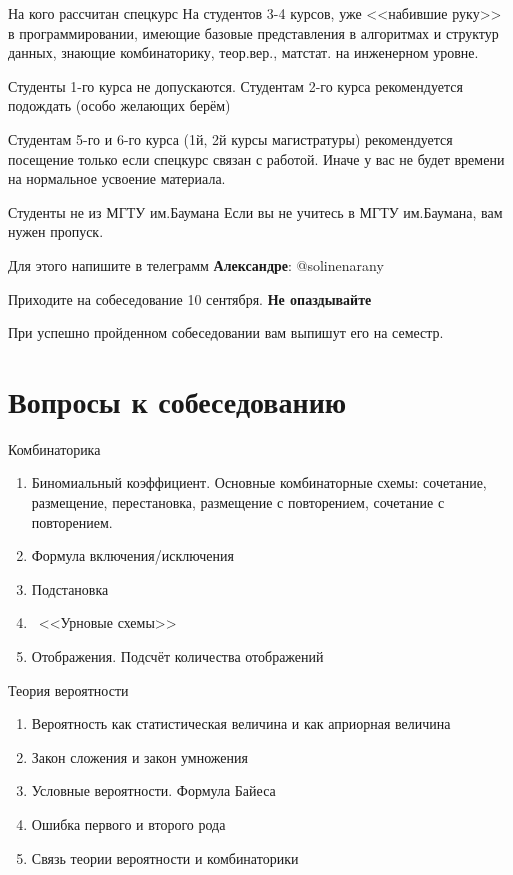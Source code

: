 \documentclass{beamer}
\newcommand{\рис}[1]{рис.\ref{#1}}
\newcommand{\Рис}[1]{Рис.\ref{#1}}
\newcommand{\таблицa}[1]{таблица~№\ref{#1}} %
\newcommand{\таблицы}[1]{таблицы~№\ref{#1}} %
\newcommand{\таблице}[1]{таблице~№\ref{#1}} %
\newcommand{\таблицу}[1]{таблицу~№\ref{#1}} %
\newcommand{\таблицей}[1]{таблицей~№\ref{#1}} %
\newcommand{\Таблицa}[1]{Таблица~№\ref{#1}} %
\newcommand{\Таблицы}[1]{Таблицы~№\ref{#1}} %
\newcommand{\Таблице}[1]{Таблице~№\ref{#1}} %
\newcommand{\Таблицу}[1]{Таблицу~№\ref{#1}} %
\newcommand{\Таблицей}[1]{Таблицей~№\ref{#1}} %
\begin{document}
  \begin{frame}{На кого рассчитан спецкурс}
  На студентов 3-4 курсов, уже <<набившие руку>> в программировании,
  имеющие базовые представления в алгоритмах и структур данных,
  знающие комбинаторику, теор.вер., матстат. на инженерном уровне.
  
  Студенты 1-го курса не допускаются. Студентам 2-го курса рекомендуется подождать
  (особо желающих берём)
  
  Студентам 5-го и 6-го курса (1й, 2й курсы магистратуры) рекомендуется посещение только если 
  спецкурс
  связан с работой.
  Иначе у вас не будет времени на нормальное усвоение материала.
  
  \end{frame}

  \begin{frame}{Студенты не из МГТУ им.Баумана}
  Если вы не учитесь в МГТУ им.Баумана, вам нужен пропуск.
  
  Для этого напишите в телеграмм \textbf{Александре}: @solinenarany
  
  Приходите на собеседование 10 сентября. 
  \textbf{Не опаздывайте}
  
  При успешно пройденном собеседовании вам выпишут его на семестр.
  \end{frame}
  
  \section{Вопросы к собеседованию}\label{section:quastions}
  
  \begin{frame}{Комбинаторика}
  \begin{enumerate}
  	\item Биномиальный коэффициент. Основные комбинаторные схемы: сочетание, размещение, перестановка, размещение с повторением, сочетание с повторением.
  	\item Формула включения/исключения
  	\item Подстановка
  	\item ~<<Урновые схемы>>
  	\item Отображения. Подсчёт количества отображений
  \end{enumerate}
  \end{frame}
  
  \begin{frame}{Теория вероятности}
  \begin{enumerate}
    \item Вероятность как статистическая величина и как априорная величина
    \item Закон сложения и закон умножения
    \item Условные вероятности. Формула Байеса
    \item Ошибка первого и второго рода
    \item Связь теории вероятности и комбинаторики
   \end{enumerate}
   \end{frame}
 
\end{document}
